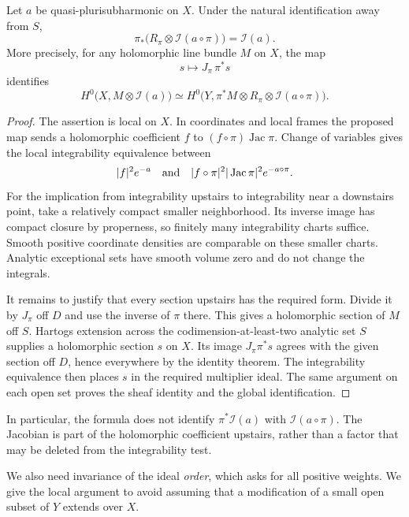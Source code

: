 \begin{lemma}\label{lem:adjoint-ideal-transform}
Let $a$ be quasi-plurisubharmonic on $X$. Under the natural identification away from $S$,
\[
 \pi_*\bigl(R_\pi\otimes\mathcal I(a\circ\pi)\bigr)
       =\mathcal I(a).
\]
More precisely, for any holomorphic line bundle $M$ on $X$, the map
\[
 s\longmapsto J_\pi\,\pi^*s
\]
identifies
\[
 H^0\bigl(X,M\otimes\mathcal I(a)\bigr)
 \simeq H^0\bigl(Y,\pi^*M\otimes R_\pi
                         \otimes\mathcal I(a\circ\pi)\bigr).
\]
\end{lemma}
\begin{proof}
The assertion is local on $X$. In coordinates and local frames the proposed map sends a holomorphic coefficient $f$ to $(f\circ\pi)\operatorname{Jac}\pi$. Change of variables gives the local integrability equivalence between
\[
 |f|^2e^{-a}
 \quad\hbox{and}\quad
 |f\circ\pi|^2|\operatorname{Jac}\pi|^2e^{-a\circ\pi}.
\]
For the implication from integrability upstairs to integrability near a downstairs point, take a relatively compact smaller neighborhood. Its inverse image has compact closure by properness, so finitely many integrability charts suffice. Smooth positive coordinate densities are comparable on these smaller charts. Analytic exceptional sets have smooth volume zero and do not change the integrals.

It remains to justify that every section upstairs has the required form. Divide it by $J_\pi$ off $D$ and use the inverse of $\pi$ there. This gives a holomorphic section of $M$ off $S$. Hartogs extension across the codimension-at-least-two analytic set $S$ supplies a holomorphic section $s$ on $X$. Its image $J_\pi\pi^*s$ agrees with the given section off $D$, hence everywhere by the identity theorem. The integrability equivalence then places $s$ in the required multiplier ideal. The same argument on each open set proves the sheaf identity and the global identification.
\end{proof}

In particular, the formula does not identify $\pi^*\mathcal I(a)$ with $\mathcal I(a\circ\pi)$. The Jacobian is part of the holomorphic coefficient upstairs, rather than a factor that may be deleted from the integrability test.

We also need invariance of the ideal \emph{order}, which asks for all positive weights. We give the local argument to avoid assuming that a modification of a small open subset of $Y$ extends over $X$.

